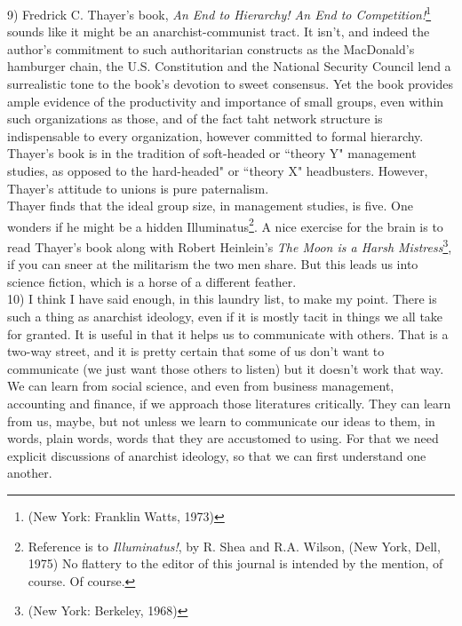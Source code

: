 9) Fredrick C. Thayer's book, \emph{An End to Hierarchy! An End to Competition!}\footnote{(New York: Franklin Watts, 1973)} sounds like it might be an anarchist-communist tract. It isn't, and indeed the author's commitment to such authoritarian constructs as the MacDonald's hamburger chain, the U.S. Constitution and the National Security Council lend a surrealistic tone to the book's devotion to sweet consensus. Yet the book provides ample evidence of the productivity and importance of small groups, even within such organizations as those, and of the fact taht network structure is indispensable to every organization, however committed to formal hierarchy. Thayer's book is in the tradition of soft-headed or ``theory Y" management studies, as opposed to the hard-headed" or ``theory X" headbusters. However, Thayer's attitude to unions is pure paternalism.\\
Thayer finds that the ideal group size, in management studies, is five. One wonders if he might be a hidden Illuminatus\footnote{Reference is to \emph{Illuminatus!}, by R. Shea and R.A. Wilson, (New York, Dell, 1975) No flattery to the editor of this journal is intended by the mention, of course. Of course.}. A nice exercise for the brain is to read Thayer's book along with Robert Heinlein's \emph{The Moon is a Harsh Mistress}\footnote{(New York: Berkeley, 1968)}, if you can sneer at the militarism the two men share. But this leads us into science fiction, which is a horse of a different feather.\\

10) I think I have said enough, in this laundry list, to make my point. There is such a thing as anarchist ideology, even if it is mostly tacit in things we all take for granted. It is useful in that it helps us to communicate with others. That is a two-way street, and it is pretty certain that some of us don't want to communicate (we just want those others to listen) but it doesn't work that way. We can learn from social science, and even from business management, accounting and finance, if we approach those literatures critically. They can learn from us, maybe, but not unless we learn to communicate our ideas to them, in words, plain words, words that they are accustomed to using. For that we need explicit discussions of anarchist ideology, so that we can first understand one another.\\